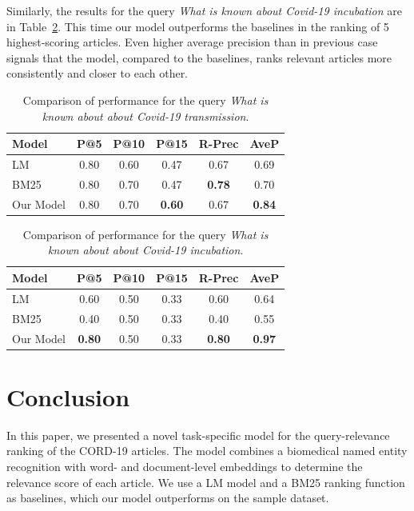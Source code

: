 \documentclass[10pt, a4paper]{article}
\begin{document}
	Similarly, the results for the query \textit{What is known about Covid-19 incubation} are in Table~\ref{tab:query2}. This time our model outperforms the baselines in the ranking of 5 highest-scoring articles. Even higher average precision than in previous case signals that the model, compared to the baselines, ranks relevant articles more consistently and closer to each other.
	
	\begin{table}
		\caption{Comparison of performance for the query \textit{What is known about about Covid-19 transmission}.}
		\label{tab:query1}
		\begin{center}
			\begin{tabular}{lccccc}
				\toprule
				Model & P@5 & P@10 & P@15 & R-Prec & AveP \\
				\midrule
				LM & 0.80 & 0.60 & 0.47 & 0.67 & 0.69  \\
				BM25 & 0.80 & 0.70 & 0.47 & \textbf{0.78} & 0.70 \\
				Our Model & 0.80 & 0.70 & \textbf{0.60} & 0.67 & \textbf{0.84} \\
				\bottomrule
			\end{tabular}
		\end{center}
	\end{table}
	
	\begin{table}
		\caption{Comparison of performance for the query \textit{What is known about about Covid-19 incubation}.}
		\label{tab:query2}
		\begin{center}
			\begin{tabular}{lccccc}
				\toprule
				Model & P@5 & P@10 & P@15 & R-Prec & AveP \\
				\midrule
				LM & 0.60 & 0.50 & 0.33 & 0.60 & 0.64 \\
				BM25 & 0.40 & 0.50 & 0.33 & 0.40 & 0.55 \\
				Our Model & \textbf{0.80} & 0.50 & 0.33 & \textbf{0.80} & \textbf{0.97} \\
				\bottomrule
			\end{tabular}
		\end{center}
	\end{table}



	\section{Conclusion}

	In this paper, we presented a novel task-specific model for the query-relevance ranking of the CORD-19 articles. The model combines a biomedical named entity recognition with word- and document-level embeddings to determine the relevance score of each article. We use a LM model and a BM25 ranking function as baselines, which our model outperforms on the sample dataset.
\end{document}
